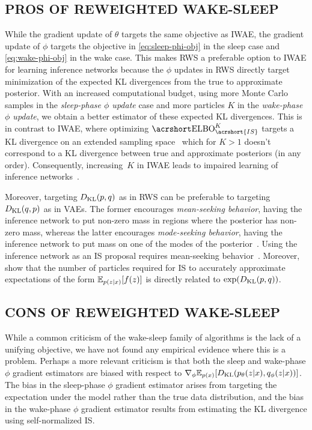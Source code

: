 \subsection{PROS OF REWEIGHTED WAKE-SLEEP}

While the gradient update of $\theta$ targets the same objective as \gls{IWAE}, the gradient update of $\phi$ targets the objective in \cref{eq:sleep-phi-obj} in the sleep case and \cref{eq:wake-phi-obj} in the wake case.
This makes \gls{RWS} a preferable option to \gls{IWAE} for learning inference networks because
the $\phi$ updates in \gls{RWS} directly target minimization of the expected \gls{KL} divergences from the true to approximate posterior.
%
With an increased computational budget, using more Monte Carlo samples in the \emph{sleep-phase $\phi$ update} case and more particles $K$ in the \emph{wake-phase $\phi$ update}, we obtain a better estimator of these expected \gls{KL} divergences.
%
This is in contrast to \gls{IWAE}, where optimizing $\ELBO_{\acrshort{IS}}^K$ targets a \gls{KL} divergence on an extended sampling space~\citep{le2018autoencoding} which for $K > 1$ doesn't correspond to a \gls{KL} divergence between true and approximate posteriors (in any order).
%
Consequently, increasing~\(K\) in \gls{IWAE} leads to impaired learning of inference networks~\citep{rainforth2018tighter}.

Moreover, targeting $D_{\mathrm{KL}}(p, q)$ as in \gls{RWS} can be preferable to targeting $D_{\mathrm{KL}}(q, p)$ as in \glspl{VAE}.
%
The former encourages \emph{mean-seeking behavior}, having the inference network to put non-zero mass in regions where the posterior has non-zero mass, whereas the latter encourages \emph{mode-seeking behavior}, having the inference network to put mass on one of the modes of the posterior~\citep{minka2005divergence}.
%
Using the inference network as an \gls{IS} proposal requires mean-seeking behavior~\citep[Theorem 9.2]{owen2013monte}.
%
Moreover, \citet{chatterjee2018sample} show that the number of particles required for \gls{IS} to accurately approximate expectations of the form $\mathbb{E}_{p(z \lvert x)}[f(z)]$ is directly related to $\exp(D_{\mathrm{KL}}(p, q))$.

\subsection{CONS OF REWEIGHTED WAKE-SLEEP}
\label{sec:disadvantages}

While a common criticism of the wake-sleep family of algorithms is the lack of a unifying objective, we have not found any empirical evidence where this is a problem.
%
Perhaps a more relevant criticism is that both the sleep and wake-phase $\phi$ gradient estimators are biased with respect to $\nabla_\phi \mathbb{E}_{p(x)}[D_{\mathrm{KL}}(p_\theta(z \lvert x), q_\phi(z \lvert x))]$.
%
The bias in the sleep-phase $\phi$ gradient estimator arises from targeting the expectation under the model rather than the true data distribution, and the bias in the wake-phase $\phi$ gradient estimator results from estimating the \gls{KL} divergence using self-normalized \gls{IS}.

